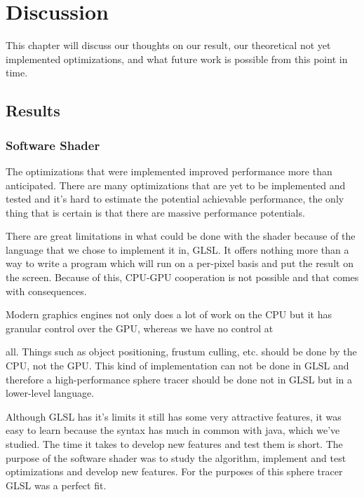 \chapter{Discussion} 

	This chapter will discuss our thoughts on our result, our theoretical not
	yet	implemented optimizations, and what future work is possible from this
	point in time.
	
	\section{Results}  \label{discussion}
		
		\subsection{Software Shader}
		

			The optimizations that were implemented improved performance more than
			anticipated. There are many optimizations that are yet to be implemented
			and tested and it's hard to estimate the potential achievable
			performance, the only thing that is certain is that there are massive
			performance potentials.

			There are great limitations in what could be done with the shader because
			of the language that we chose to implement it in, GLSL. It offers nothing
			more than a way to write a program which will run on a per-pixel basis
			and put the result on the screen. Because of this, CPU-GPU cooperation is
			not possible and that comes with consequences.

			Modern graphics engines not only does a lot of work on the CPU but
			it has granular control over the GPU, whereas we have no control at

			all. Things such as object positioning, frustum culling, etc.
			should be done by the CPU, not the GPU. This kind of implementation
			can not be done in GLSL and therefore a high-performance sphere
			tracer should be done not in GLSL but in a lower-level language.

			Although GLSL has it's limits it still has some very attractive features,
			it was easy to learn because the syntax has much in common with java,
			which we've studied. The time it takes to develop new features and test
			them is short. The purpose of the software shader was to study the
			algorithm, implement and test optimizations and develop new features. For
			the purposes of this sphere tracer GLSL was a perfect fit.
		
